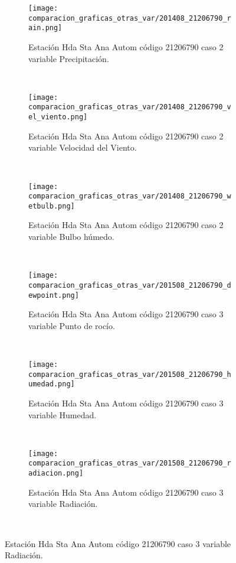 \begin{figure}[H]
\centering
\begin{subfigure}[normla]{0.4\textwidth}
\caption{Estación Hda Sta Ana Autom código 21206790 caso 2 variable Precipitación.}
\texttt{[image: comparacion\_graficas\_otras\_var/201408\_21206790\_rain.png]}
\end{subfigure}
~
\begin{subfigure}[normla]{0.4\textwidth}
\caption{Estación Hda Sta Ana Autom código 21206790 caso 2 variable Velocidad del Viento.}
\texttt{[image: comparacion\_graficas\_otras\_var/201408\_21206790\_vel\_viento.png]}
\end{subfigure}
~
\begin{subfigure}[normla]{0.4\textwidth}
\caption{Estación Hda Sta Ana Autom código 21206790 caso 2 variable Bulbo húmedo.}
\texttt{[image: comparacion\_graficas\_otras\_var/201408\_21206790\_wetbulb.png]}
\end{subfigure}
~
\begin{subfigure}[normla]{0.4\textwidth}
\caption{Estación Hda Sta Ana Autom código 21206790 caso 3 variable Punto de rocío.}
\texttt{[image: comparacion\_graficas\_otras\_var/201508\_21206790\_dewpoint.png]}
\end{subfigure}
~
\begin{subfigure}[normla]{0.4\textwidth}
\caption{Estación Hda Sta Ana Autom código 21206790 caso 3 variable Humedad.}
\texttt{[image: comparacion\_graficas\_otras\_var/201508\_21206790\_humedad.png]}
\end{subfigure}
~
\begin{subfigure}[normla]{0.4\textwidth}
\caption{Estación Hda Sta Ana Autom código 21206790 caso 3 variable Radiación.}
\texttt{[image: comparacion\_graficas\_otras\_var/201508\_21206790\_radiacion.png]}
\end{subfigure}
~
\end{figure}
           
